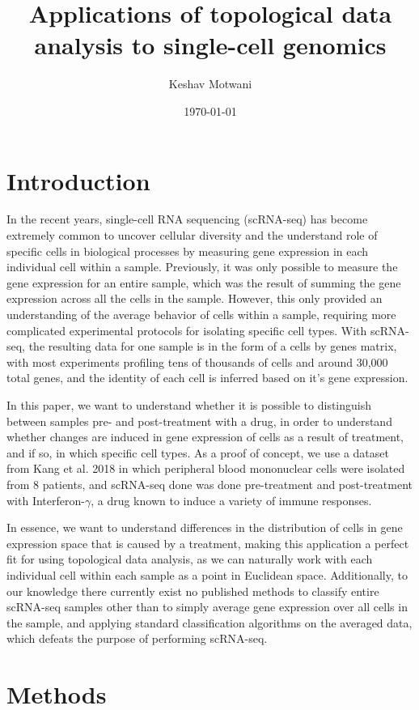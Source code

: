 \documentclass[11pt]{article}
\title{Applications of topological data analysis to single-cell genomics}
\date{\today}
\author{Keshav Motwani}
\begin{document}
\maketitle
\section{Introduction}

In the recent years, single-cell RNA sequencing (scRNA-seq) has become extremely common to uncover cellular diversity and the understand role of specific cells in biological processes by measuring gene expression in each individual cell within a sample. Previously, it was only possible to measure the gene expression for an entire sample, which was the result of summing the gene expression across all the cells in the sample. However, this only provided an understanding of the average behavior of cells within a sample, requiring more complicated experimental protocols for isolating specific cell types. With scRNA-seq, the resulting data for one sample is in the form of a cells by genes matrix, with most experiments profiling tens of thousands of cells and around 30,000 total genes, and the identity of each cell is inferred based on it's gene expression.

In this paper, we want to understand whether it is possible to distinguish between samples pre- and post-treatment with a drug, in order to understand whether changes are induced in gene expression of cells as a result of treatment, and if so, in which specific cell types. As a proof of concept, we use a dataset from Kang et al. 2018 in which peripheral blood mononuclear cells were isolated from 8 patients, and scRNA-seq done was done pre-treatment and post-treatment with Interferon-$\gamma$, a drug known to induce a variety of immune responses.

In essence, we want to understand differences in the distribution of cells in gene expression space that is caused by a treatment, making this application a perfect fit for using topological data analysis, as we can naturally work with each individual cell within each sample as a point in Euclidean space. Additionally, to our knowledge there currently exist no published methods to classify entire scRNA-seq samples other than to simply average gene expression over all cells in the sample, and applying standard classification algorithms on the averaged data, which defeats the purpose of performing scRNA-seq.

\section{Methods}
\end{document}
